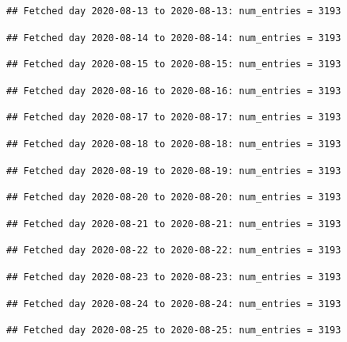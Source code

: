 \documentclass[]{article}
\begin{document}
\begin{verbatim}
## Fetched day 2020-08-13 to 2020-08-13: num_entries = 3193
\end{verbatim}

\begin{verbatim}
## Fetched day 2020-08-14 to 2020-08-14: num_entries = 3193
\end{verbatim}

\begin{verbatim}
## Fetched day 2020-08-15 to 2020-08-15: num_entries = 3193
\end{verbatim}

\begin{verbatim}
## Fetched day 2020-08-16 to 2020-08-16: num_entries = 3193
\end{verbatim}

\begin{verbatim}
## Fetched day 2020-08-17 to 2020-08-17: num_entries = 3193
\end{verbatim}

\begin{verbatim}
## Fetched day 2020-08-18 to 2020-08-18: num_entries = 3193
\end{verbatim}

\begin{verbatim}
## Fetched day 2020-08-19 to 2020-08-19: num_entries = 3193
\end{verbatim}

\begin{verbatim}
## Fetched day 2020-08-20 to 2020-08-20: num_entries = 3193
\end{verbatim}

\begin{verbatim}
## Fetched day 2020-08-21 to 2020-08-21: num_entries = 3193
\end{verbatim}

\begin{verbatim}
## Fetched day 2020-08-22 to 2020-08-22: num_entries = 3193
\end{verbatim}

\begin{verbatim}
## Fetched day 2020-08-23 to 2020-08-23: num_entries = 3193
\end{verbatim}

\begin{verbatim}
## Fetched day 2020-08-24 to 2020-08-24: num_entries = 3193
\end{verbatim}

\begin{verbatim}
## Fetched day 2020-08-25 to 2020-08-25: num_entries = 3193
\end{verbatim}
\end{document}
